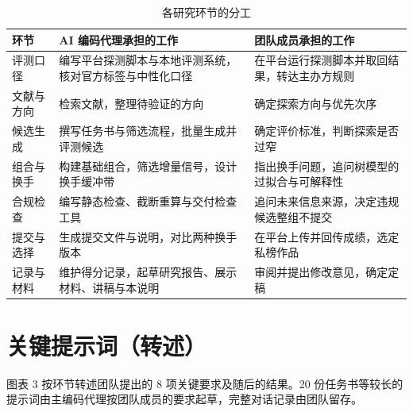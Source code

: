 \documentclass[UTF8,a4paper,zihao=-4,fontset=none]{ctexart}
\newcommand{\tablesetup}{\small\linespread{1.05}\selectfont\renewcommand{\arraystretch}{1.18}}
\begin{document}
\begin{table}[!htbp]
\caption{各研究环节的分工}
\centering
{\tablesetup
\begin{tabularx}{\textwidth}{@{}P{2.4cm}LL@{}}
\toprule
环节 & AI 编码代理承担的工作 & 团队成员承担的工作\\
\midrule
评测口径 & 编写平台探测脚本与本地评测系统，核对官方标签与中性化口径 & 在平台运行探测脚本并取回结果，转达主办方规则\\
文献与方向 & 检索文献，整理待验证的方向 & 确定探索方向与优先次序\\
候选生成 & 撰写任务书与筛选流程，批量生成并评测候选 & 确定评价标准，判断探索是否过窄\\
组合与换手 & 构建基础组合，筛选增量信号，设计换手缓冲带 & 指出换手问题，追问树模型的过拟合与可解释性\\
合规检查 & 编写静态检查、截断重算与交付检查工具 & 追问未来信息来源，决定违规候选整组不提交\\
提交与选择 & 生成提交文件与说明，对比两种换手版本 & 在平台上传并回传成绩，选定私榜作品\\
记录与材料 & 维护得分记录，起草研究报告、展示材料、讲稿与本说明 & 审阅并提出修改意见，确定定稿\\
\bottomrule
\end{tabularx}}
\end{table}

\section{关键提示词（转述）}

图表 3 按环节转述团队提出的 8 项关键要求及随后的结果。20 份任务书等较长的提示词由主编码代理按团队成员的要求起草，完整对话记录由团队留存。
\end{document}
